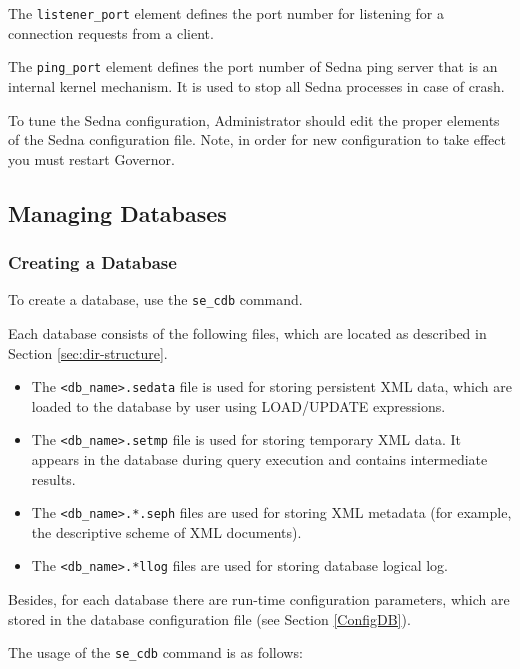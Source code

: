 \documentclass[a4paper,12pt]{article}
\begin{document}
The \verb!listener_port! element defines the port number for listening for a connection requests from a client.

The \verb!ping_port! element defines the port number of Sedna ping server that is an internal kernel mechanism. It is used to stop all Sedna processes in case of crash. 
 
To tune the Sedna configuration, Administrator should edit the proper elements of the Sedna configuration file. Note, in order for new configuration to take effect you must restart Governor.

\subsection{Managing Databases}
\subsubsection{Creating a Database}
\label{CreateDB}
To create a database, use the \verb!se_cdb! command.

Each database consists of the following files, which are located as described in Section \ref{sec:dir-structure}.

\begin{itemize}
\item The \verb!<db_name>.sedata! file is used for storing persistent XML data, which are loaded to the database by user using LOAD/UPDATE expressions. 
\item The \verb!<db_name>.setmp! file is used for storing temporary XML data. It appears in the database during query execution and contains intermediate results.
\item The \verb!<db_name>.*.seph! files are used for storing XML metadata (for example, the descriptive scheme of XML documents).
\item The \verb!<db_name>.*llog! files are used for storing database logical log.
\end{itemize}

Besides, for each database there are run-time configuration parameters, which are stored in the database configuration file (see Section \ref{ConfigDB}).

The usage of the \verb!se_cdb! command is as follows:
\end{document}

